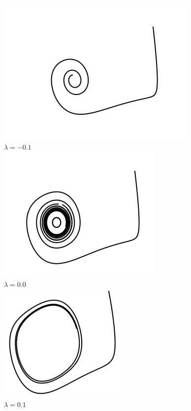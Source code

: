 \documentclass[11pt]{book}
\theoremstyle{definition}
\numberwithin{definition}{section}
\theoremstyle{theorem}
\numberwithin{theorem}{section}
\numberwithin{lemma}{section}
\numberwithin{corollary}{section}
\theoremstyle{plain}
\numberwithin{example}{section}
\begin{document}
\begin{figure}[!ht] \centering
	\includegraphics[scale=0.35]{figures/vanderpol-hopfbifurcation--0_1.png} \\ $\lambda = -0.1$ \\
	\includegraphics[scale=0.35]{figures/vanderpol-hopfbifurcation-0_0.png} \\ $\lambda = 0.0$ \\
	\includegraphics[scale=0.35]{figures/vanderpol-hopfbifurcation-0_1.png} \\ $\lambda = 0.1$ \\

\end{figure}
\end{document}
